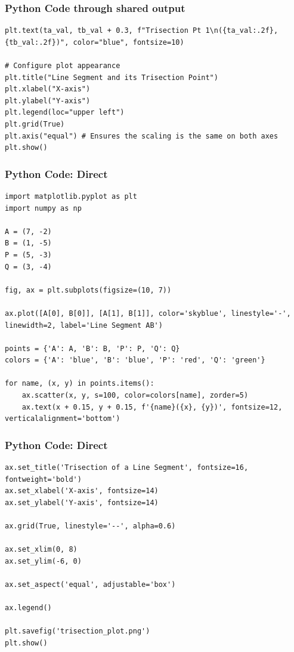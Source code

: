 \documentclass{beamer}
\begin{document}
\begin{frame}[fragile]
\frametitle{Python Code through shared output}
\begin{lstlisting}
plt.text(ta_val, tb_val + 0.3, f"Trisection Pt 1\n({ta_val:.2f}, {tb_val:.2f})", color="blue", fontsize=10)

# Configure plot appearance
plt.title("Line Segment and its Trisection Point")
plt.xlabel("X-axis")
plt.ylabel("Y-axis")
plt.legend(loc="upper left")
plt.grid(True)
plt.axis("equal") # Ensures the scaling is the same on both axes
plt.show()
\end{lstlisting}
\end{frame}

\begin{frame}[fragile]
\frametitle{Python Code: Direct}
\begin{lstlisting}
import matplotlib.pyplot as plt
import numpy as np

A = (7, -2)
B = (1, -5)
P = (5, -3)
Q = (3, -4)

fig, ax = plt.subplots(figsize=(10, 7))

ax.plot([A[0], B[0]], [A[1], B[1]], color='skyblue', linestyle='-', linewidth=2, label='Line Segment AB')

points = {'A': A, 'B': B, 'P': P, 'Q': Q}
colors = {'A': 'blue', 'B': 'blue', 'P': 'red', 'Q': 'green'}

for name, (x, y) in points.items():
    ax.scatter(x, y, s=100, color=colors[name], zorder=5) 
    ax.text(x + 0.15, y + 0.15, f'{name}({x}, {y})', fontsize=12, verticalalignment='bottom')
\end{lstlisting}
\end{frame}

\begin{frame}[fragile]
\frametitle{Python Code: Direct}
\begin{lstlisting}
ax.set_title('Trisection of a Line Segment', fontsize=16, fontweight='bold')
ax.set_xlabel('X-axis', fontsize=14)
ax.set_ylabel('Y-axis', fontsize=14)

ax.grid(True, linestyle='--', alpha=0.6)

ax.set_xlim(0, 8)
ax.set_ylim(-6, 0)

ax.set_aspect('equal', adjustable='box')

ax.legend()

plt.savefig('trisection_plot.png')
plt.show()
\end{lstlisting}
\end{frame}
\end{document}
